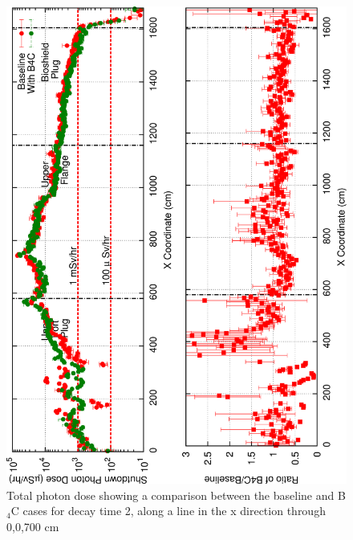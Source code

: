 \documentclass[12pt]{article}
\begin{document}
\begin{figure}[ht!]
\centering
\includegraphics[angle=-90,clip,scale=0.15]{../plots/photon_lineout/dc2_z700_lineout.png}
\caption{Total photon dose showing a comparison between the baseline and B$_4$C cases for decay time 2,
                 along a line in the x direction through 0,0,700 cm}
\label{fig:photons_dc2_total_dose_lineout_z700}
\end{figure}
\end{document}
